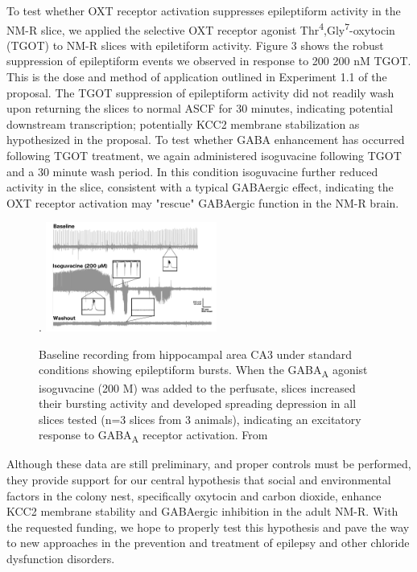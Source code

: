 \documentclass[11pt]{nih}
\begin{document}
\par To test whether OXT receptor activation suppresses epileptiform activity in the NM-R slice, we applied the selective OXT receptor agonist Thr\textsuperscript{4},Gly\textsuperscript{7}-oxytocin (TGOT) to NM-R slices with epiletiform activity.  Figure 3 shows the robust suppression of epileptiform events we observed in response to 200 200 nM TGOT. This is the dose and method of application outlined in Experiment 1.1 of the proposal. The TGOT suppression of epileptiform activity did not readily wash upon returning the slices to normal ASCF for 30 minutes, indicating potential downstream transcription; potentially KCC2 membrane stabilization as hypothesized in the proposal. To test whether GABA enhancement has occurred following TGOT treatment, we again administered isoguvacine following TGOT and a 30 minute wash period.  In this condition isoguvacine further reduced activity in the slice, consistent with a typical GABAergic effect, indicating the OXT receptor activation may "rescue" GABAergic function in the NM-R brain. 
\begin{figure}.
 \centering
 \includegraphics[width=0.5\textwidth]{isoguvacine.png}
 \caption{Baseline recording from hippocampal area CA3 under standard conditions showing epileptiform bursts.  When the GABA\textsubscript {A} agonist isoguvacine (200 \textmu M) was added to the perfusate, slices  increased their bursting activity and developed spreading depression in all slices tested (n=3 slices from 3 animals), indicating an excitatory response to GABA\textsubscript {A} receptor activation.  From \cite{zions_2020_nest}}
\end{figure}
\par Although these data are still preliminary, and proper controls must be performed, they provide support for our central hypothesis that social and environmental factors in the colony nest, specifically oxytocin and carbon dioxide, enhance KCC2 membrane stability and GABAergic inhibition in the adult NM-R.  With the requested funding, we hope to properly test this hypothesis and pave the way to new approaches in the prevention and treatment of epilepsy and other chloride dysfunction disorders.


\newpage

\end{document}
